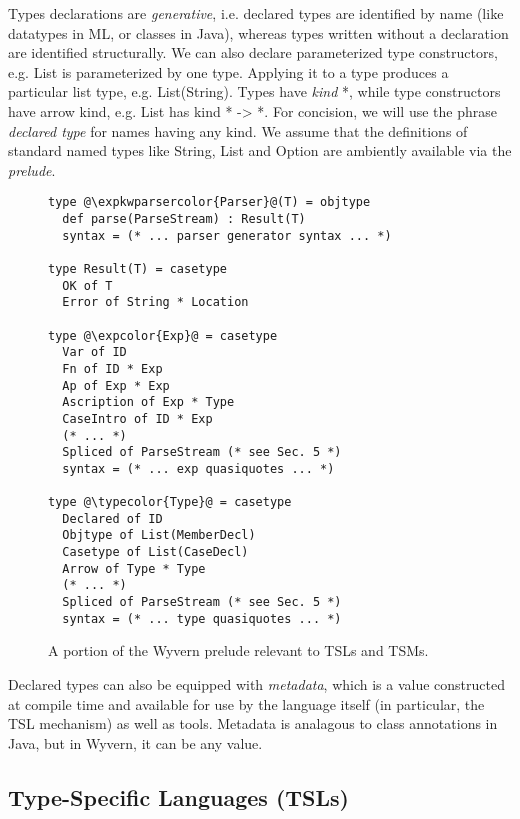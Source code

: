 \documentclass{sig-alternate}[10pt]
\makeatletter
\newcommand\BeraMonottfamily{%
  \def\fvm@Scale{0.85}%
  \fontfamily{fvm}\selectfont%
}
\newcommand{\expkwparsercolor}[1]{\textcolor[HTML]{336699}{#1}}
\newcommand{\expcolor}[1]{\textcolor[HTML]{FF0033}{#1}}
\newcommand{\typecolor}[1]{\textcolor[HTML]{660066}{#1}}
\newcommand{\mycaption}[1]{\vspace{-5px}\caption{#1}\vspace{-5px}}
\newcommand{\lstinlinew}[1]{{\scriptsize\BeraMonottfamily #1}}
\makeatother
\begin{document}
Types declarations are \emph{generative}, i.e. declared types are identified by name (like datatypes in ML, or classes in Java), whereas types written without a declaration are identified structurally. We can also declare parameterized type constructors, e.g. \lstinlinew{List} is parameterized by one type. Applying it to a type produces a particular list type, e.g. \lstinlinew{List(String)}. Types have \emph{kind} \lstinlinew{*}, while {type constructors} have arrow kind, e.g. \lstinlinew{List} has kind \lstinlinew{* -> *}. For concision, we will use the phrase \emph{declared type} for names having any kind. 
We assume that the definitions of standard named types like \lstinlinew{String}, \lstinlinew{List} and \lstinlinew{Option} are ambiently available via the \emph{prelude}. 

\begin{figure}[t!]
\begin{lstlisting}[style=wyvern]
type @\expkwparsercolor{Parser}@(T) = objtype
  def parse(ParseStream) : Result(T)
  syntax = (* ... parser generator syntax ... *)

type Result(T) = casetype
  OK of T
  Error of String * Location

type @\expcolor{Exp}@ = casetype
  Var of ID
  Fn of ID * Exp
  Ap of Exp * Exp
  Ascription of Exp * Type
  CaseIntro of ID * Exp
  (* ... *)
  Spliced of ParseStream (* see Sec. 5 *)
  syntax = (* ... exp quasiquotes ... *)

type @\typecolor{Type}@ = casetype
  Declared of ID
  Objtype of List(MemberDecl)
  Casetype of List(CaseDecl)
  Arrow of Type * Type
  (* ... *)
  Spliced of ParseStream (* see Sec. 5 *)
  syntax = (* ... type quasiquotes ... *)
\end{lstlisting}
\mycaption{A portion of the Wyvern prelude relevant to TSLs and TSMs.}
\label{exp-prelude}
\end{figure}


Declared types can also be equipped with \emph{metadata}, which is a value constructed at compile time and available for use by the language itself (in particular, the TSL mechanism) as well as tools. Metadata is analagous to class annotations in Java, but in Wyvern, it can be any value. %

\subsection{Type-Specific Languages (TSLs)}
\end{document}
